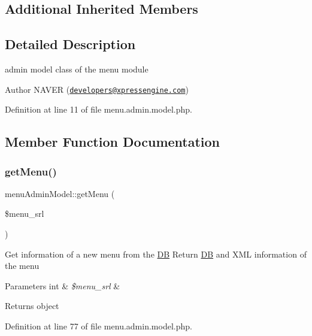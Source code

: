 \subsection*{Additional Inherited Members}


\subsection{Detailed Description}
admin model class of the menu module 

\begin{DoxyAuthor}{Author}
N\+A\+V\+ER (\href{mailto:developers@xpressengine.com}{\tt developers@xpressengine.\+com}) 
\end{DoxyAuthor}


Definition at line 11 of file menu.\+admin.\+model.\+php.



\subsection{Member Function Documentation}
\mbox{\label{classmenuAdminModel_a303e32a7d98c99847035407e7ed4e951}} 
\subsubsection{\texorpdfstring{get\+Menu()}{getMenu()}}
{\footnotesize\ttfamily menu\+Admin\+Model\+::get\+Menu (\begin{DoxyParamCaption}\item[{}]{\$menu\+\_\+srl }\end{DoxyParamCaption})}

Get information of a new menu from the \hyperlink{classDB}{DB} Return \hyperlink{classDB}{DB} and X\+ML information of the menu 
\begin{DoxyParams}[1]{Parameters}
int & {\em \$menu\+\_\+srl} & \\
\hline
\end{DoxyParams}
\begin{DoxyReturn}{Returns}
object 
\end{DoxyReturn}


Definition at line 77 of file menu.\+admin.\+model.\+php.

\mbox{\label{classmenuAdminModel_ac55866233401318f5c9c2529a924c06b}} 
